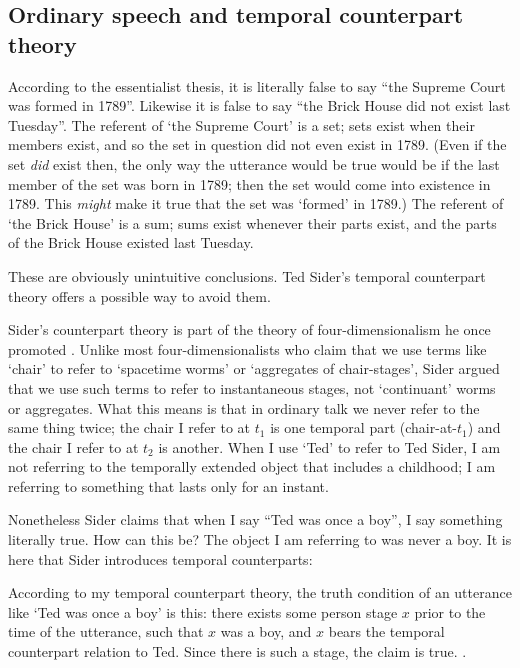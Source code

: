 \documentclass[11pt]{article}
\newenvironment{squote}{%
\begin{spacing}{1}
\begin{list}{}{%
\setlength{\labelwidth}{0pt}%
\rightmargin\leftmargin%
}
\item\relax
}{%
\end{list}%
\end{spacing}
}
\begin{document}
\begin{spacing}{1.5}
\subsection{Ordinary speech and temporal counterpart theory}
\label{counterpart}
According to the essentialist thesis, it is literally false to say
``the Supreme Court was formed in 1789''.  Likewise it is false to say
``the Brick House did not exist last Tuesday''.  The referent of `the
Supreme Court' is a set; sets exist when their members exist, and so
the set in question did not even exist in 1789.  (Even if the set {\em
  did} exist then, the only way the utterance would be true would be
if the last member of the set was born in 1789; then the set would
come into existence in 1789.  This {\em might} make it true that the
set was `formed' in 1789.)  The referent of `the Brick House' is a
sum; sums exist whenever their parts exist, and the parts of the Brick
House existed last Tuesday.

These are obviously unintuitive conclusions.  Ted Sider's temporal
counterpart theory offers a possible way to avoid them.

Sider's counterpart theory is part of the theory of
four-dimensionalism he once promoted \citeyearpar{sider2001}.  Unlike
most four-dimensionalists who claim that we use terms like `chair' to
refer to `spacetime worms' or `aggregates of chair-stages', Sider
argued that we use such terms to refer to instantaneous stages, not
`continuant' worms or aggregates.  What this means is that in ordinary
talk we never refer to the same thing twice; the chair I refer to at
$t_1$ is one temporal part (chair-at-$t_1$) and the chair I refer to
at $t_2$ is another.  When I use `Ted' to refer to Ted Sider, I am not
referring to the temporally extended object that includes a childhood;
I am referring to something that lasts only for an instant.

Nonetheless Sider claims that when I say ``Ted was once a boy'', I say
something literally true.  How can this be?  The object I am referring
to was never a boy.  It is here that Sider introduces temporal
counterparts:

\begin{squote}
According to my temporal counterpart theory, the truth condition of an
utterance like `Ted was once a boy' is this: there exists some person
stage $x$ prior to the time of the utterance, such that $x$ was a boy,
and $x$ bears the temporal counterpart relation to Ted.  Since there
is such a stage, the claim is true. \citeyearpar[193]{sider2001}.
\end{squote}


\end{spacing}
\end{document}
